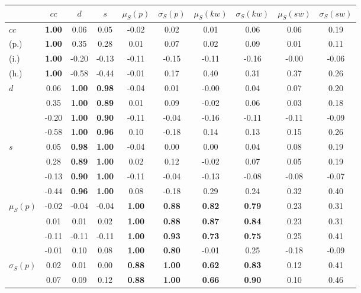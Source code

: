 \begin{table*}[h!]
\begin{center}
\begin{tabular}{| l || c | c | c | c | c | c | c | c | c |}\hline
 & $cc$ & $d$ & $s$ & $\mu_S(p)$ & $\sigma_S(p)$ & $\mu_S(kw)$ & $\sigma_S(kw)$ & $\mu_S(sw)$ & $\sigma_S(sw)$ \\\hline\hline
$cc$ & {\bf 1.00} & 0.06 & 0.05 & -0.02 & 0.02 & 0.01 & 0.06 & 0.06 & 0.19 \\
(p.) & {\bf 1.00} & 0.35 & 0.28 & 0.01 & 0.07 & 0.02 & 0.09 & 0.01 & 0.11 \\
(i.) & {\bf 1.00} & -0.20 & -0.13 & -0.11 & -0.15 & -0.11 & -0.16 & -0.00 & -0.06 \\
(h.) & {\bf 1.00} & -0.58 & -0.44 & -0.01 & 0.17 & 0.40 & 0.31 & 0.37 & 0.26 \\\hline
$d$ & 0.06 & {\bf 1.00} & {\bf 0.98} & -0.04 & 0.01 & -0.00 & 0.04 & 0.07 & 0.20 \\
 & 0.35 & {\bf 1.00} & {\bf 0.89} & 0.01 & 0.09 & -0.02 & 0.06 & 0.03 & 0.18 \\
 & -0.20 & {\bf 1.00} & {\bf 0.90} & -0.11 & -0.04 & -0.16 & -0.11 & -0.11 & -0.09 \\
 & -0.58 & {\bf 1.00} & {\bf 0.96} & 0.10 & -0.18 & 0.14 & 0.13 & 0.15 & 0.26 \\\hline
$s$ & 0.05 & {\bf 0.98} & {\bf 1.00} & -0.04 & 0.00 & 0.00 & 0.04 & 0.08 & 0.19 \\
 & 0.28 & {\bf 0.89} & {\bf 1.00} & 0.02 & 0.12 & -0.02 & 0.07 & 0.05 & 0.19 \\
 & -0.13 & {\bf 0.90} & {\bf 1.00} & -0.11 & -0.04 & -0.13 & -0.08 & -0.08 & -0.07 \\
 & -0.44 & {\bf 0.96} & {\bf 1.00} & 0.08 & -0.18 & 0.29 & 0.24 & 0.32 & 0.40 \\\hline
$\mu_S(p)$ & -0.02 & -0.04 & -0.04 & {\bf 1.00} & {\bf 0.88} & {\bf 0.82} & {\bf 0.79} & 0.23 & 0.31 \\
 & 0.01 & 0.01 & 0.02 & {\bf 1.00} & {\bf 0.88} & {\bf 0.87} & {\bf 0.84} & 0.23 & 0.31 \\
 & -0.11 & -0.11 & -0.11 & {\bf 1.00} & {\bf 0.93} & {\bf 0.73} & {\bf 0.75} & 0.25 & 0.41 \\
 & -0.01 & 0.10 & 0.08 & {\bf 1.00} & {\bf 0.80} & -0.01 & 0.25 & -0.18 & -0.09 \\\hline
$\sigma_S(p)$ & 0.02 & 0.01 & 0.00 & {\bf 0.88} & {\bf 1.00} & {\bf 0.62} & {\bf 0.83} & 0.12 & 0.41 \\
 & 0.07 & 0.09 & 0.12 & {\bf 0.88} & {\bf 1.00} & {\bf 0.66} & {\bf 0.90} & 0.10 & 0.46 \\

\end{tabular}
\end{center}
\end{table*}
